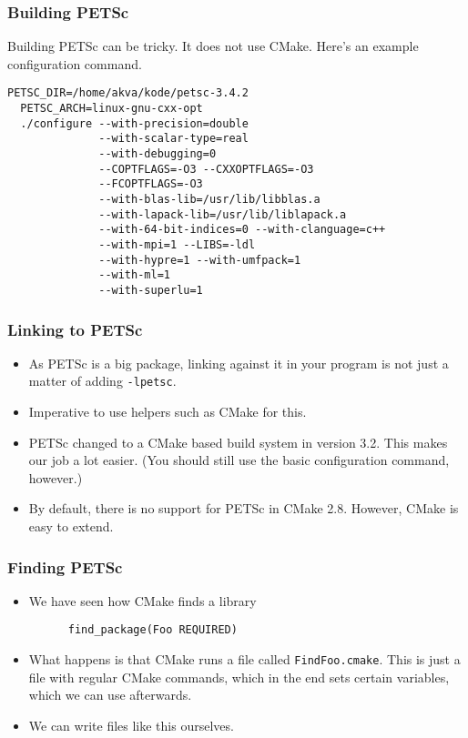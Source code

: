 \begin{frame}[fragile]
  \frametitle{Building PETSc}
  Building PETSc can be tricky. It does not use CMake. Here's an example
  configuration command.
  \begin{lstlisting}[basicstyle=\ttfamily\scriptsize]
  PETSC_DIR=/home/akva/kode/petsc-3.4.2
  PETSC_ARCH=linux-gnu-cxx-opt
  ./configure --with-precision=double
              --with-scalar-type=real
              --with-debugging=0
              --COPTFLAGS=-O3 --CXXOPTFLAGS=-O3
              --FCOPTFLAGS=-O3
              --with-blas-lib=/usr/lib/libblas.a
              --with-lapack-lib=/usr/lib/liblapack.a
              --with-64-bit-indices=0 --with-clanguage=c++
              --with-mpi=1 --LIBS=-ldl
              --with-hypre=1 --with-umfpack=1
              --with-ml=1
              --with-superlu=1
  \end{lstlisting}
\end{frame}

\begin{frame}
  \frametitle{Linking to PETSc}
  \begin{itemize}
  \item As PETSc is a big package, linking against it in your program is not just
    a matter of adding \texttt{-lpetsc}.
  \item Imperative to use helpers such as CMake for this.
  \item PETSc changed to a CMake based build system in version 3.2. This makes
    our job a lot easier. (You should still use the basic configuration command,
    however.)
  \item By default, there is no support for PETSc in CMake 2.8. However,
    CMake is easy to extend.
  \end{itemize}
\end{frame}

\begin{frame}[fragile]
  \frametitle{Finding PETSc}
  \begin{itemize}
  \item We have seen how CMake finds a library
    \begin{lstlisting}
      find_package(Foo REQUIRED)
    \end{lstlisting}
  \item What happens is that CMake runs a file called \texttt{FindFoo.cmake}.
    This is just a file with regular CMake commands, which in the end sets
    certain variables, which we can use afterwards.
  \item We can write files like this ourselves.
  \end{itemize}
\end{frame}

